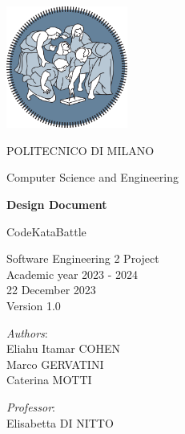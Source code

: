 \begin{titlingpage}
	\begin{center}
		\includegraphics[width=0.3\textwidth]{images/logo_polimi.png}
		
		\vspace{0.25cm}
		
		\LARGE POLITECNICO DI MILANO\\
		
		\vspace{0.2cm}
		
		\Large Computer Science and Engineering
		
		\vspace{0.8cm}
	
		\Huge \textbf{Design Document}
		
		\vspace{0.5cm}
		\huge CodeKataBattle
		
		\vspace{1.5cm}
		\LARGE Software Engineering 2 Project\\
		\Large Academic year 2023 - 2024\\
		\vspace{1cm}
		22 December 2023\\Version 1.0
		\vspace{3cm}
		
		\large
		\begin{minipage}{.4\textwidth}
			\textit{Authors}:\\
			Eliahu Itamar COHEN\\
			Marco GERVATINI\\
                Caterina MOTTI
		\end{minipage}%
		\begin{minipage}{.4\textwidth}
			\raggedleft	
			\textit{Professor}:\\
			Elisabetta DI NITTO\\
			\phantom{placeholder}
		\end{minipage}%
		\begin{minipage}{.1\textwidth}
			\null
		\end{minipage}
	
			
		\end{center}
\end{titlingpage}